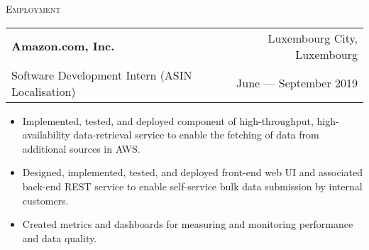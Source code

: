 \documentclass[11pt]{article}
\begin{document}
\midrule

\textsc{Employment}

\begin{tabularx}{\textwidth}{X r}
    \textbf{Amazon.com, Inc.}                       & \small{Luxembourg City, Luxembourg} \\
    Software Development Intern (ASIN Localisation) & \small{June --- September 2019} \\
\end{tabularx}
\begin{itemize}
    \item Implemented, tested, and deployed component of high-throughput,
        high-availability data-retrieval service to enable the fetching of data from
        additional sources in AWS.\@
    \item Designed, implemented, tested, and deployed front-end web UI and associated
        back-end REST service to enable self-service bulk data submission by internal
        customers.
    \item Created metrics and dashboards for measuring and monitoring performance and data
        quality.
\end{itemize}
\end{document}
